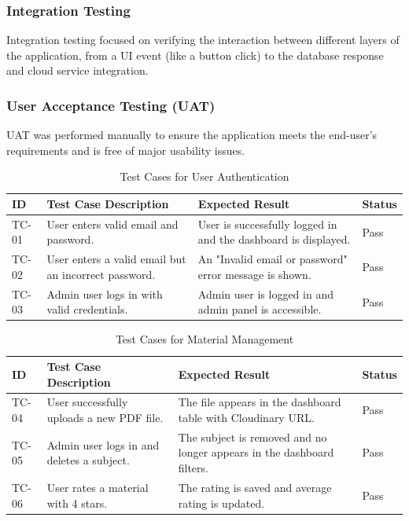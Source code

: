 \documentclass[12pt, a4paper]{report}
\begin{document}
\subsubsection{Integration Testing}
Integration testing focused on verifying the interaction between different layers of the application, from a UI event (like a button click) to the database response and cloud service integration.

\subsubsection{User Acceptance Testing (UAT)}
UAT was performed manually to ensure the application meets the end-user's requirements and is free of major usability issues.

\begin{table}[h!]
    \centering
    \caption{Test Cases for User Authentication}
    \label{tab:auth_tests}
    \begin{tabular}{|p{1cm}|p{4.5cm}|p{4.5cm}|p{2cm}|}
        \hline
        \textbf{ID} & \textbf{Test Case Description} & \textbf{Expected Result} & \textbf{Status} \\
        \hline
        TC-01 & User enters valid email and password. & User is successfully logged in and the dashboard is displayed. & Pass \\
        \hline
        TC-02 & User enters a valid email but an incorrect password. & An "Invalid email or password" error message is shown. & Pass \\
        \hline
        TC-03 & Admin user logs in with valid credentials. & Admin user is logged in and admin panel is accessible. & Pass \\
        \hline
    \end{tabular}
\end{table}

\begin{table}[h!]
    \centering
    \caption{Test Cases for Material Management}
    \label{tab:material_tests}
    \begin{tabular}{|p{1cm}|p{4.5cm}|p{4.5cm}|p{2cm}|}
        \hline
        \textbf{ID} & \textbf{Test Case Description} & \textbf{Expected Result} & \textbf{Status} \\
        \hline
        TC-04 & User successfully uploads a new PDF file. & The file appears in the dashboard table with Cloudinary URL. & Pass \\
        \hline
        TC-05 & Admin user logs in and deletes a subject. & The subject is removed and no longer appears in the dashboard filters. & Pass \\
        \hline
        TC-06 & User rates a material with 4 stars. & The rating is saved and average rating is updated. & Pass \\
        \hline
    \end{tabular}
\end{table}
\end{document}
